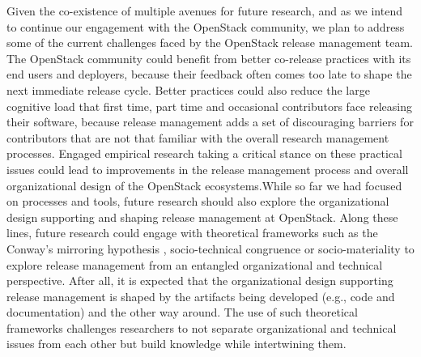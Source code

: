 \documentclass[dvipsnames]{bmcart}
\theoremstyle{definition}
\renewenvironment{newStuff}{}{}
\begin{document}
Given the co-existence of multiple avenues for future research, and as we intend to continue our engagement with the OpenStack community, we plan to address some of the current challenges faced by the OpenStack release management team. The OpenStack community could benefit from better co-release practices with its end users and deployers, because their feedback often comes too late to shape the next immediate release cycle. Better practices could also reduce the large cognitive load that first time, part time and occasional contributors face releasing their software, because release management adds a set of discouraging barriers for contributors that are not that familiar with the overall research management processes.  Engaged empirical research taking a critical stance on these practical issues could lead to improvements in the release management process and overall organizational design of the OpenStack ecosystems.\begin{newStuff}While so far we had focused on processes and tools, future research should also explore the organizational design supporting and shaping release management at OpenStack. Along these lines, future research could engage with theoretical frameworks such as the Conway's mirroring hypothesis \cite{kwan_et_al2012conway}, socio-technical congruence \cite{cataldo_et_al2008stc} or socio-materiality \cite{Orlikowski_and_Scott2008} to explore release management from an entangled organizational and technical perspective. After all, it is expected that the organizational design supporting release management is shaped by the artifacts being developed (e.g., code and documentation) and the other way around. The use of such theoretical frameworks challenges researchers to not separate organizational and technical issues from each other but build knowledge while intertwining them.                                                                                                                                                                                                                                                                                                                                                                                                                                                                                                                                                                                                                                                                                                                                                                                                                                                                                                                                                                                                                                                                                                                                                                                                                                                                                                                                                                                                                                                                              
\end{document}
